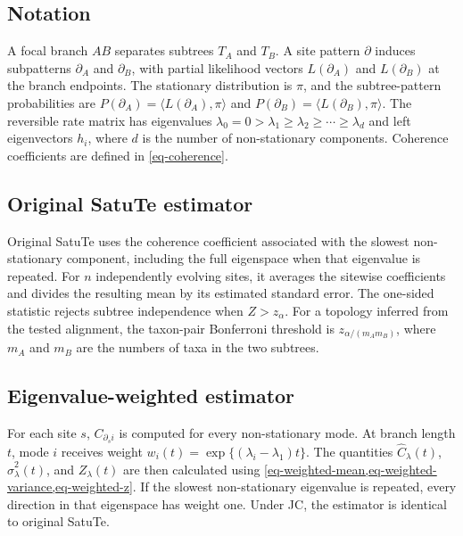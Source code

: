 \subsection*{Notation}

A focal branch \(AB\) separates subtrees \(T_A\) and \(T_B\). A site pattern \(\partial\) induces subpatterns \(\partial_A\) and \(\partial_B\), with partial likelihood vectors \(L(\partial_A)\) and \(L(\partial_B)\) at the branch endpoints. The stationary distribution is \(\pi\), and the subtree-pattern probabilities are \(P(\partial_A)=\langle L(\partial_A),\pi\rangle\) and \(P(\partial_B)=\langle L(\partial_B),\pi\rangle\). The reversible rate matrix has eigenvalues \(\lambda_0=0>\lambda_1\geq\lambda_2\geq\cdots\geq\lambda_d\) and left eigenvectors \(h_i\), where \(d\) is the number of non-stationary components. Coherence coefficients are defined in \cref{eq-coherence}.

\subsection*{Original SatuTe estimator}

Original SatuTe uses the coherence coefficient associated with the slowest non-stationary component, including the full eigenspace when that eigenvalue is repeated. For \(n\) independently evolving sites, it averages the sitewise coefficients and divides the resulting mean by its estimated standard error. The one-sided statistic rejects subtree independence when \(Z>z_\alpha\). For a topology inferred from the tested alignment, the taxon-pair Bonferroni threshold is \(z_{\alpha/(m_A m_B)}\), where \(m_A\) and \(m_B\) are the numbers of taxa in the two subtrees.

\subsection*{Eigenvalue-weighted estimator}

For each site \(s\), \(C_{\partial_s i}\) is computed for every non-stationary mode. At branch length \(t\), mode \(i\) receives weight \(w_i(t)=\exp\{(\lambda_i-\lambda_1)t\}\). The quantities \(\hat C_{\lambda}(t)\), \(\hat\sigma_{\lambda}^{2}(t)\), and \(Z_{\lambda}(t)\) are then calculated using \cref{eq-weighted-mean,eq-weighted-variance,eq-weighted-z}. If the slowest non-stationary eigenvalue is repeated, every direction in that eigenspace has weight one. Under JC, the estimator is identical to original SatuTe.

